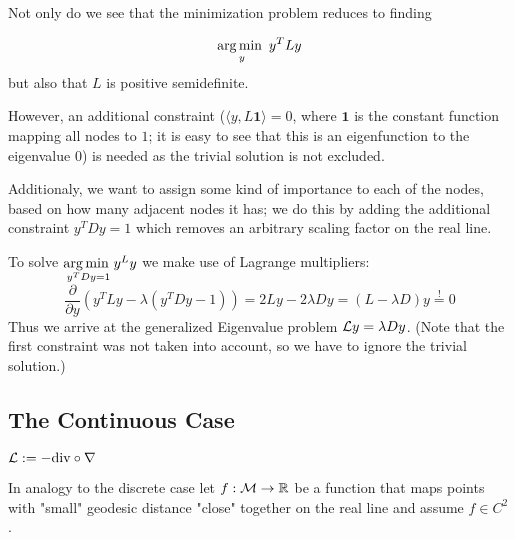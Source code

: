 Not only do we see that the minimization problem reduces to finding

\begin{equation*}
    \argmin_y y^TLy
\end{equation*}
but also that $L$ is positive semidefinite.

However, an additional constraint ($\langle y,L\mathbf{1}\rangle = 0$, where $\mathbf{1}$ is the constant function mapping all nodes to $1$; it is easy to see that this is an eigenfunction to the eigenvalue $0$) is needed as the trivial solution is not excluded.

Additionaly, we want to assign some kind of importance to each of the nodes, based on how many adjacent nodes it has; we do this by adding the additional constraint $y^TDy=1$ which removes an arbitrary scaling factor on the real line.

To solve $\underset{y^TDy=1}{\argmin}y^Ly$ we make use of Lagrange multipliers:
\begin{equation*}
    \frac{\partial}{\partial y}(y^TLy-\lambda(y^TDy-1)) =
    2Ly-2\lambda Dy =
    (L-\lambda D)y \overset{!}{=}0
\end{equation*}
Thus we arrive at the generalized Eigenvalue problem $\mathcal{L} y=\lambda Dy$. (Note that the first constraint was not taken into account, so we have to ignore the trivial solution.)

\subsection{The Continuous Case}
\begin{definition}
    $\mathcal{L} :=-\mathrm{div}\circ\nabla$
\end{definition}

In analogy to the discrete case let $f:\mathcal{M}\rightarrow\mathbb{R}$ be a function that maps points with "small" geodesic distance "close" together on the real line and assume $f\in C^2$.